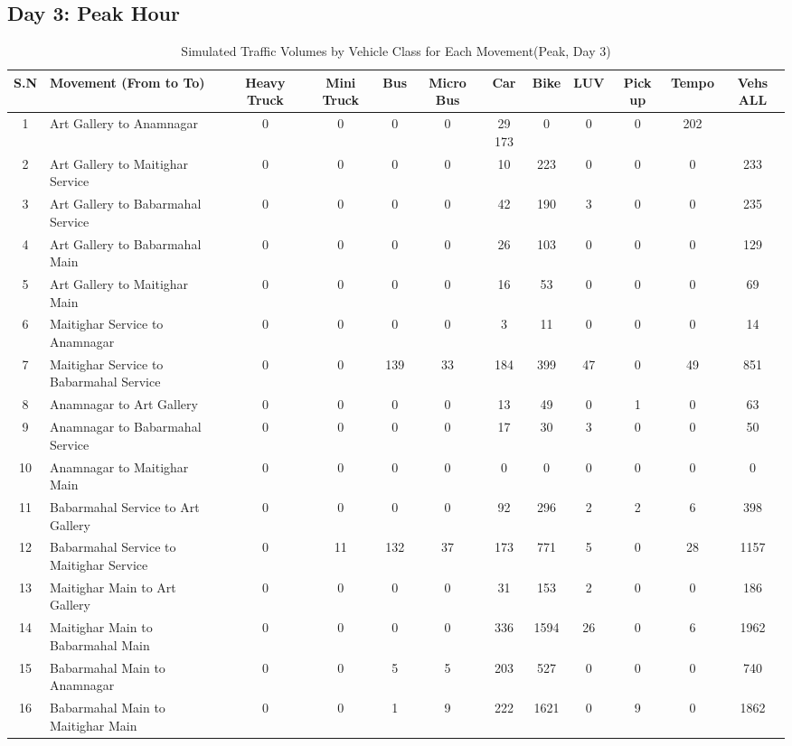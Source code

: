 \begin{landscape}
\begin{table}[h]
\begin{tabular}{|c|p{6cm}|c|c|c|c|c|c|c|c|c|c|}
\end{tabular}
\end{table}
\end{landscape}



\begin{landscape}
\section{Day 3: Peak Hour}
\begin{table}[h!]
\centering
\caption{Simulated Traffic Volumes by Vehicle Class for Each Movement(Peak, Day 3)}
\small
\setlength{\tabcolsep}{5pt}
    
\begin{tabular}{|c|p{6cm}|c|c|c|c|c|c|c|c|c|c|}
\hline
S.N& Movement (From to To)& Heavy Truck & Mini Truck & Bus & Micro Bus & Car & Bike & LUV & Pick up & Tempo & Vehs ALL \\ \hline
1	&Art Gallery to Anamnagar	            &0	&0	&0	&0	&29	173	&0	&0	&0	&202 \\ \hline
2	&Art Gallery to Maitighar Service	    &0	&0	&0	&0	&10	&223	&0	&0	&0	&233 \\ \hline
3	&Art Gallery to Babarmahal Service	    &0	&0	&0	&0	&42	&190	&3	&0	&0	&235   \\ \hline
4	&Art Gallery to Babarmahal Main	        &0	&0	&0	&0	&26	&103	&0	&0	&0	&129 \\ \hline
5	&Art Gallery to Maitighar Main	        &0	&0	&0	&0	&16	&53	&0	&0	&0	&69 \\ \hline
6	&Maitighar Service to Anamnagar	        &0	&0	&0	&0	&3	&11	&0	&0	&0	&14 \\ \hline
7	&Maitighar Service to Babarmahal Service	&0	&0	&139	&33	&184	&399	&47	&0	&49	&851 \\ \hline
8	&Anamnagar to Art Gallery	            &0	&0	&0	&0	&13	&49	&0	&1	&0	&63 \\ \hline
9	&Anamnagar to Babarmahal Service	        &0	&0	&0	&0	&17	&30	&3	&0	&0	&50 \\ \hline
10	&Anamnagar to Maitighar Main	            &0	&0	&0	&0	&0	&0	&0	&0	&0	&0 \\ \hline
11	&Babarmahal Service to Art Gallery	    &0	&0	&0	&0	&92	&296	&2	&2	&6	&398 \\ \hline
12	&Babarmahal Service to Maitighar Service &0 &11 &132 &37 &173 &771 &5 &0 &28 &1157 \\ \hline
13	&Maitighar Main to Art Gallery	        &0& 0& 0&0&31&153&2&0&0&186\\ \hline
14	&Maitighar Main to Babarmahal Main	    &0& 0& 0&0&336&1594&26&0&6&1962\\ \hline
15	&Babarmahal Main to Anamnagar	        &0& 0&5&5&203&527&0&0&0&740 \\ \hline
16	&Babarmahal Main to Maitighar Main	    &0& 0&1&9&222&1621&0&9&0&1862 \\ \hline

\end{tabular}
\end{table}
\end{landscape}


